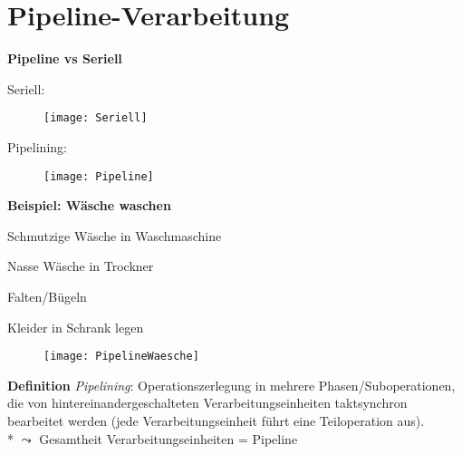 \section{Pipeline-Verarbeitung}
\label{sec:pipelining}

\textbf{Pipeline vs Seriell}
\begin{items}
  \item Seriell:
  \begin{figure}[ht]
    \centering
    \texttt{[image: Seriell]}
    \label{Seriell}
  \end{figure}
  \item Pipelining:
  \begin{figure}[ht]
    \centering
    \texttt{[image: Pipeline]}
    \label{Pipeline}
  \end{figure}
\end{items}

\textbf{Beispiel: Wäsche waschen}
\begin{enumeration}
  \item Schmutzige Wäsche in Waschmaschine
  \item Nasse Wäsche in Trockner
  \item Falten/Bügeln
  \item Kleider in Schrank legen
\end{enumeration}
\begin{figure}[ht]
  \centering
  \label{PipelineWaesche}
  \texttt{[image: PipelineWaesche]}
\end{figure}

\textbf{Definition} \emph{Pipelining}: Operationszerlegung in mehrere Phasen/Suboperationen, die von hintereinandergeschalteten Verarbeitungseinheiten taktsynchron bearbeitet werden (jede Verarbeitungseinheit führt eine Teiloperation aus). \\*
$\leadsto$ Gesamtheit Verarbeitungseinheiten = Pipeline

\ \\

